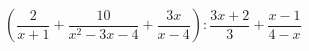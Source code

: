 \begin{ex}[type=expression]
	\begin{condition}
		\(\left( \dfrac{2}{x+1}+\dfrac{10}{x^2-3x-4}+\dfrac{3x}{x-4} \right):\dfrac{3x+2}{3}+\dfrac{x-1}{4-x}\)
	\end{condition}
\end{ex}